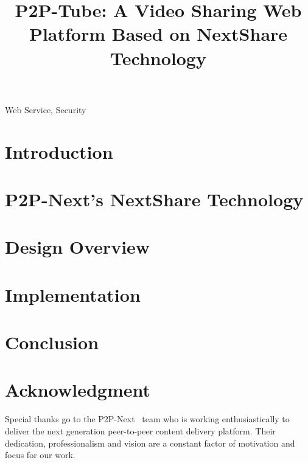 \documentclass[conference]{IEEEtran}
\begin{document}
\title{P2P-Tube: A Video Sharing Web Platform Based on NextShare Technology}

\author{
}

\maketitle

\begin{abstract}

\end{abstract}


\begin{IEEEkeywords}
Web Service, Security
\end{IEEEkeywords}


\section{Introduction}
\label{sec:introduction}


\section{P2P-Next's NextShare Technology}
\label{sec:next-share}


\section{Design Overview}
\label{sec:design}


\section{Implementation}
\label{sec:implementation}


\section{Conclusion}
\label{sec:conclusion}


\section*{Acknowledgment}
\label{sec:acknowledgment}

Special thanks go to the P2P-Next~\cite{p2p-next} team who is working
enthusiastically to deliver the next generation peer-to-peer content delivery
platform. Their dedication, professionalism and vision are a constant factor
of motivation and focus for our work.



\end{document}

